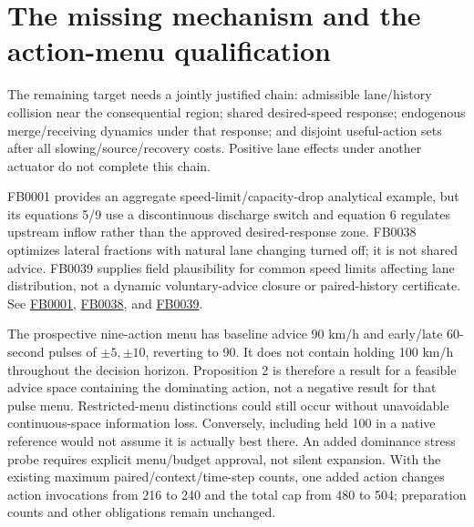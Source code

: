 \documentclass[11pt]{article}
\begin{document}
\section{The missing mechanism and the action-menu qualification}
The remaining target needs a jointly justified chain: admissible lane/history
collision near the consequential region; shared desired-speed response; endogenous
merge/receiving dynamics under that response; and disjoint useful-action sets
after all slowing/source/recovery costs. Positive lane effects under another
actuator do not complete this chain.

FB0001 provides an aggregate speed-limit/capacity-drop analytical example, but its
equations 5/9 use a discontinuous discharge switch and equation 6 regulates
upstream inflow rather than the approved desired-response zone. FB0038 optimizes
lateral fractions with natural lane changing turned off; it is not shared advice.
FB0039 supplies field plausibility for common speed limits affecting lane
distribution, not a dynamic voluntary-advice closure or paired-history certificate.
See \href{https://arxiv.org/abs/1310.2658}{FB0001},
\href{https://doi.org/10.1177/0361198120948055}{FB0038}, and
\href{https://doi.org/10.1016/j.trc.2017.01.024}{FB0039}.

The prospective nine-action menu has baseline advice 90 km/h and early/late
60-second pulses of $\pm5,\pm10$, reverting to 90. It does not contain holding
100 km/h throughout the decision horizon. Proposition 2 is therefore a result
for a feasible advice space containing the dominating action, not a negative
result for that pulse menu. Restricted-menu distinctions could still occur
without unavoidable continuous-space information loss. Conversely, including
held 100 in a native reference would not assume it is actually best there.
An added dominance stress probe requires explicit menu/budget approval, not
silent expansion. With the existing maximum paired/context/time-step counts,
one added action changes action invocations from 216 to 240 and the total cap
from 480 to 504; preparation counts and other obligations remain unchanged.
\end{document}

